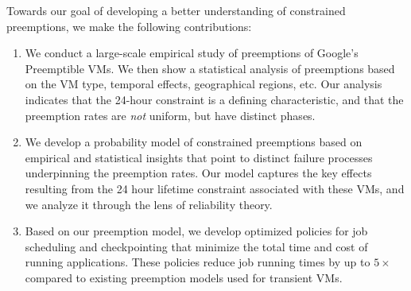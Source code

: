 


Towards our goal of developing a better understanding of constrained preemptions, we make the following contributions:
\begin{enumerate} [leftmargin=12pt]

\item We conduct a large-scale empirical study of preemptions of Google's Preemptible VMs. We then show a statistical analysis of preemptions based on the VM type, temporal effects, geographical regions, etc. Our analysis 
  indicates that the 24-hour constraint is a defining characteristic, and that the preemption rates are \emph{not} uniform, but have distinct phases. 

\item We develop a probability model of constrained preemptions based on empirical and statistical insights that point to distinct failure processes underpinning the preemption rates. Our model captures the key effects resulting from the 24 hour lifetime constraint associated with these VMs, and we analyze it through the lens of reliability theory.


\item Based on our preemption model, we develop optimized policies for job scheduling and checkpointing that minimize the total time and cost of running applications. These policies reduce job running times by up to $5\times$ compared to existing preemption models used for transient VMs. 
  

\end{enumerate}
